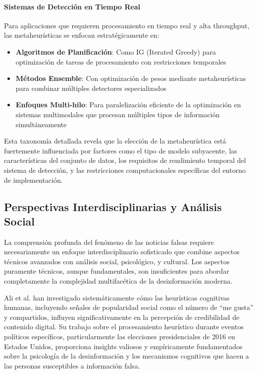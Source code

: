 \paragraph{Sistemas de Detección en Tiempo Real}
Para aplicaciones que requieren procesamiento en tiempo real y alta throughput, las metaheurísticas se enfocan estratégicamente en:
\begin{itemize}
    \item \textbf{Algoritmos de Planificación}: Como IG (Iterated Greedy) para optimización de tareas de procesamiento con restricciones temporales \cite{aqil2021modeling}
    \item \textbf{Métodos Ensemble}: Con optimización de pesos mediante metaheurísticas para combinar múltiples detectores especializados \cite{das2022heuristic, yasmin2024ensemble}
    \item \textbf{Enfoques Multi-hilo}: Para paralelización eficiente de la optimización en sistemas multimodales que procesan múltiples tipos de información simultáneamente \cite{yildirim2023novel}
\end{itemize}

Esta taxonomía detallada revela que la elección de la metaheurística está fuertemente influenciada por factores como el tipo de modelo subyacente, las características del conjunto de datos, los requisitos de rendimiento temporal del sistema de detección, y las restricciones computacionales específicas del entorno de implementación.

\subsection{Perspectivas Interdisciplinarias y Análisis Social}

La comprensión profunda del fenómeno de las noticias falsas requiere necesariamente un enfoque interdisciplinario sofisticado que combine aspectos técnicos avanzados con análisis social, psicológico, y cultural. Los aspectos puramente técnicos, aunque fundamentales, son insuficientes para abordar completamente la complejidad multifacética de la desinformación moderna.

Ali et al. \cite{ali2021fake, ali2020posttruth} han investigado sistemáticamente cómo las heurísticas cognitivas humanas, incluyendo señales de popularidad social como el número de ``me gusta'' y compartidos, influyen significativamente en la percepción de credibilidad de contenido digital. Su trabajo sobre el procesamiento heurístico durante eventos políticos específicos, particularmente las elecciones presidenciales de 2016 en Estados Unidos, proporciona insights valiosos y empíricamente fundamentados sobre la psicología de la desinformación y los mecanismos cognitivos que hacen a las personas susceptibles a información falsa.

